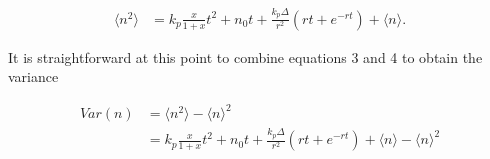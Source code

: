 \begin{equation}
\begin{aligned}
\langle n^2 \rangle & = k_p \frac{x}{1+x}t^2 + n_0t + \frac{k_p \Delta}{r^2}(rt+e^{-rt}) + \langle n \rangle.
\end{aligned}
\end{equation}

It is straightforward at this point to combine equations 3 and 4 to obtain the variance

\begin{equation}
\begin{aligned}
Var(n) & = \langle n^2 \rangle - {\langle n \rangle}^2\\
	   & = k_p \frac{x}{1+x}t^2 + n_0t + \frac{k_p \Delta}{r^2}(rt+e^{-rt}) + \langle n \rangle - {\langle n \rangle}^2
\end{aligned}
\end{equation}


